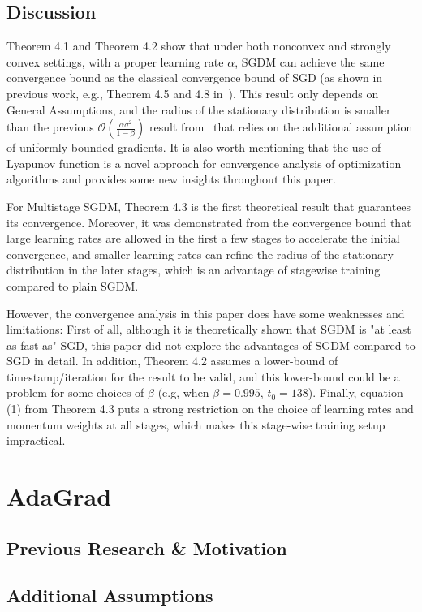 \documentclass{article}
\begin{document}
\subsection{Discussion}
Theorem 4.1 and Theorem 4.2 show that under both nonconvex and strongly convex settings, with a proper learning rate $\alpha$, SGDM can achieve the same convergence bound as the classical convergence bound of SGD (as shown in previous work, e.g., Theorem 4.5 and 4.8 in~\cite{https://doi.org/10.48550/arxiv.1606.04838}). This result only depends on General Assumptions, and the radius of the stationary distribution is smaller than the previous $\mathcal{O}(\frac{\alpha\sigma^2}{1 - \beta})$ result from~\cite{https://doi.org/10.48550/arxiv.1905.03817} that relies on the additional assumption of uniformly bounded gradients. It is also worth mentioning that the use of Lyapunov function is a novel approach for convergence analysis of optimization algorithms and provides some new insights throughout this paper. 

For Multistage SGDM, Theorem 4.3 is the first theoretical result that guarantees its convergence. Moreover, it was demonstrated from the convergence bound that large learning rates are allowed in the first a few stages to accelerate the initial convergence, and smaller learning rates can refine the radius of the stationary distribution in the later stages, which is an advantage of stagewise training compared to plain SGDM.

However, the convergence analysis in this paper does have some weaknesses and limitations: First of all, although it is theoretically shown that SGDM is "at least as fast as" SGD, this paper did not explore the advantages of SGDM compared to SGD in detail. In addition, Theorem 4.2 assumes a lower-bound of timestamp/iteration for the result to be valid, and this lower-bound could be a problem for some choices of $\beta$ (e.g, when $\beta = 0.995$, $t_0 = 138$). Finally, equation (1) from Theorem 4.3 puts a strong restriction on the choice of learning rates and momentum weights at all stages, which makes this stage-wise training setup impractical.
\newpage
\section{AdaGrad}
\label{section5}
\subsection{Previous Research \& Motivation}
\subsection{Additional Assumptions}
\end{document}
